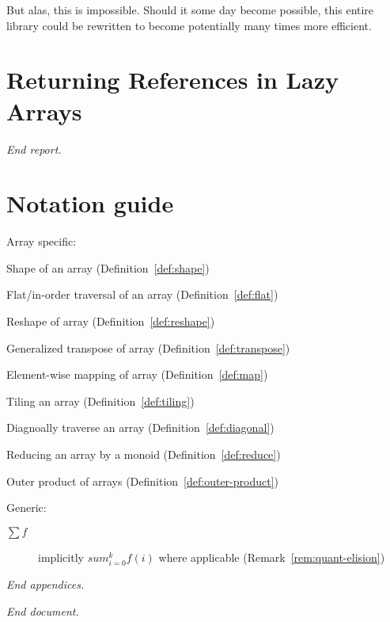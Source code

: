 \documentclass{DIKU-report-variant}
\newcommand\mrm[1]{\mathrm{#1}}
\newcommand\brm[1]{\bm{\mrm{#1}}}
\newcommand\reduce{\operatorname*{\brm{reduce}\,}}
\newcommand\diag{\operatorname*{\brm{diag}\,}}
\newcommand\tile{\operatorname*{\brm{tile}\,}}
\newcommand\oprodby[1]{\mathop{\operatorname*{\,\brm{by}}_{#1}}}
\begin{document}
But alas, this is impossible. Should it some day become possible, this entire library could be
rewritten to become potentially many times more efficient.

\section{Returning References in Lazy Arrays}

\vfill
\begin{center}\itshape End report.\end{center}
\clearpage

\appendix
\renewcommand\thesection{\Alph{section}}
{}

\section{Notation guide}

Array specific:
\begin{description}[align=left,labelwidth=7em]
  \item[\(\sharp A\)] Shape of an array (Definition~\ref{def:shape})
  \item[\(\flat A\)] Flat/in-order traversal of an array (Definition~\ref{def:flat})
  \item[\(\varrho(A, \rho)\)] Reshape of array (Definition~\ref{def:reshape})
  \item[\(A \circ \sigma\)] Generalized transpose of array (Definition~\ref{def:transpose})
  \item[\(f \circ A\)] Element-wise mapping of array (Definition~\ref{def:map})
  \item[\(\tile_{\times k, x} A\)] Tiling an array (Definition~\ref{def:tiling})
  \item[\(\diag_{x, y} A\)] Diagnoally traverse an array (Definition~\ref{def:diagonal})
  \item[\(\reduce^k_{(S, \oplus, \epsilon)} A\)] Reducing an array by a monoid (Definition~\ref{def:reduce})
  \item[\(A \oprodby f B\)] Outer product of arrays (Definition~\ref{def:outer-product})
\end{description}

Generic:
\begin{description}
  \item[\(\sum f\)] implicitly \(sum_{i=0}^{k} f(i)\) where applicable (Remark~\ref{rem:quant-elision})
\end{description}

\vfill
\begin{center}\itshape End appendices.\end{center}
\clearpage

{}
\printbibliography

\vfill
\begin{center}\itshape End document.\end{center}
\end{document}
